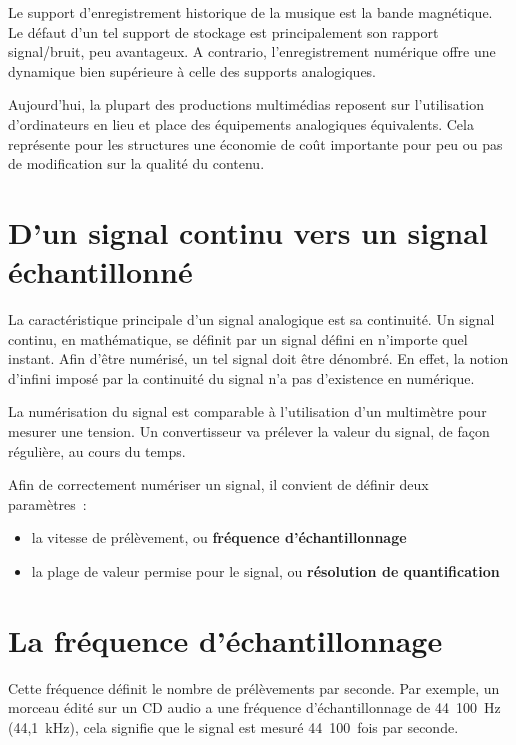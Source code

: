 \documentclass[
]{book}
\providecommand{\tightlist}{%
  \setlength{\itemsep}{0pt}\setlength{\parskip}{0pt}}
\begin{document}
Le support d'enregistrement historique de la musique est la bande magnétique. Le défaut d'un tel support de stockage est principalement son rapport signal/bruit, peu avantageux. A contrario, l'enregistrement numérique offre une dynamique bien supérieure à celle des supports analogiques.

Aujourd'hui, la plupart des productions multimédias reposent sur l'utilisation d'ordinateurs en lieu et place des équipements analogiques équivalents. Cela représente pour les structures une économie de coût importante pour peu ou pas de modification sur la qualité du contenu.

\hypertarget{dun-signal-continu-vers-un-signal-uxe9chantillonnuxe9}{%
\section{D'un signal continu vers un signal échantillonné}\label{dun-signal-continu-vers-un-signal-uxe9chantillonnuxe9}}

La caractéristique principale d'un signal analogique est sa continuité. Un signal continu, en mathématique, se définit par un signal défini en n'importe quel instant. Afin d'être numérisé, un tel signal doit être dénombré. En effet, la notion d'infini imposé par la continuité du signal n'a pas d'existence en numérique.

La numérisation du signal est comparable à l'utilisation d'un multimètre pour mesurer une tension. Un convertisseur va prélever la valeur du signal, de façon régulière, au cours du temps.

Afin de correctement numériser un signal, il convient de définir deux paramètres~:

\begin{itemize}
\tightlist
\item
  la vitesse de prélèvement, ou \textbf{fréquence d'échantillonnage}
\item
  la plage de valeur permise pour le signal, ou \textbf{résolution de quantification}
\end{itemize}

\hypertarget{la-fruxe9quence-duxe9chantillonnage}{%
\section{La fréquence d'échantillonnage}\label{la-fruxe9quence-duxe9chantillonnage}}

Cette fréquence définit le nombre de prélèvements par seconde. Par exemple, un morceau édité sur un CD audio a une fréquence d'échantillonnage de 44~100~Hz (44,1~kHz), cela signifie que le signal est mesuré 44~100~fois par seconde.
\end{document}
